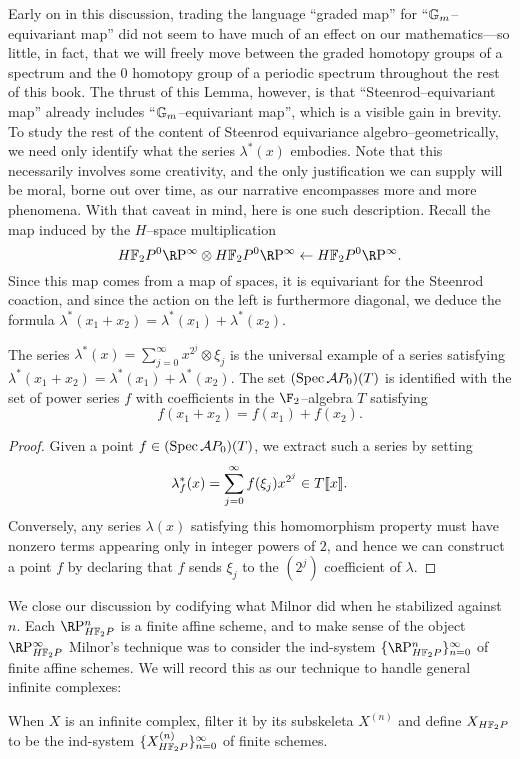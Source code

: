 Early on in this discussion, trading the language ``graded map'' for ``\(\mathbb G_m\)--equivariant map'' did not seem to have much of an effect on our mathematics---so little, in fact, that we will freely move between the graded homotopy groups of a spectrum and the \(0\){\th} homotopy group of a periodic spectrum throughout the rest of this book.  The thrust of this Lemma, however, is that ``Steenrod--equivariant map'' already includes ``\(\mathbb G_m\)--equivariant map'', which is a visible gain in brevity.  To study the rest of the content of Steenrod equivariance algebro--geometrically, we need only identify what the series \(\lambda^*(x)\) embodies.  Note that this necessarily involves some creativity, and the only justification we can supply will be moral, borne out over time, as our narrative encompasses more and more phenomena.  With that caveat in mind, here is one such description.  Recall the map induced by the \(H\)--space multiplication \[\HFtwo P^0 \RP^\infty \otimes \HFtwo P^0 \RP^\infty \leftarrow \HFtwo P^0 \RP^\infty.\]  Since this map comes from a map of spaces, it is equivariant for the Steenrod coaction, and since the action on the left is furthermore diagonal, we deduce the formula \(\lambda^*(x_1 + x_2) = \lambda^*(x_1) + \lambda^*(x_2)\).

\begin{lemma}\label{SteenrodAlgIdentifiedWithAutGa}
The series \(\lambda^*(x) = \sum_{j=0}^\infty x^{2^j} \otimes \xi_j\) is the universal example of a series satisfying \(\lambda^*(x_1 + x_2) = \lambda^*(x_1) + \lambda^*(x_2)\).  The set \((\operatorname{Spec} \mathcal AP_0)(T)\) is identified with the set of power series \(f\) with coefficients in the \(\F_2\)--algebra \(T\) satisfying \[f(x_1 + x_2) = f(x_1) + f(x_2).\]
\end{lemma}
\begin{proof}
Given a point \(f \in (\operatorname{Spec} \mathcal AP_0)(T)\), we extract such a series by setting \[\lambda^*_f(x) = \sum_{j=0}^\infty f(\xi_j) x^{2^j} \in T\llbracket{x}\rrbracket.\]  Conversely, any series \(\lambda(x)\) satisfying this homomorphism property must have nonzero terms appearing only in integer powers of \(2\), and hence we can construct a point \(f\) by declaring that \(f\) sends \(\xi_j\) to the \((2^j)\){\th} coefficient of \(\lambda\).
\end{proof}

We close our discussion by codifying what Milnor did when he stabilized against \(n\).  Each \(\RP^n_{\HFtwo P}\) is a finite affine scheme, and to make sense of the object \(\RP^\infty_{\HFtwo P}\) Milnor's technique was to consider the ind-system \(\{\RP^n_{\HFtwo P}\}_{n=0}^\infty\) of finite affine schemes.  We will record this as our technique to handle general infinite complexes:
\begin{definition}\label{FullDefnOfXHF2}
When \(X\) is an infinite complex, filter it by its subskeleta \(X^{(n)}\) and define \(X_{\HFtwo P}\) to be the ind-system \(\{X^{(n)}_{\HFtwo P}\}_{n=0}^\infty\) of finite schemes.
\end{definition}

